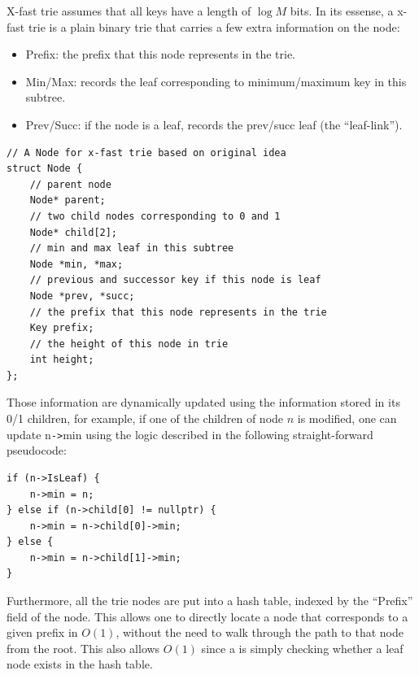 \documentclass[11pt, usletter]{article}
\begin{document}
X-fast trie assumes that all keys have a length of $\log M$ bits.
In its essense, a x-fast trie is a plain binary trie that carries a few extra information on the node:
\begin{itemize}
[topsep=0pt,partopsep=0pt,itemsep=0pt,parsep=0pt,fullwidth,itemindent=\parindent,listparindent=\parindent]
\item Prefix: the prefix that this node represents in the trie.
\item Min/Max: records the leaf corresponding to minimum/maximum key in this subtree.
\item Prev/Succ: if the node is a leaf, records the prev/succ leaf (the ``leaf-link'').
\end{itemize}

\singlespacing\begin{codebox}
\begin{verbatim}
// A Node for x-fast trie based on original idea
struct Node {
    // parent node
    Node* parent;
    // two child nodes corresponding to 0 and 1
    Node* child[2];
    // min and max leaf in this subtree
    Node *min, *max;
    // previous and successor key if this node is leaf
    Node *prev, *succ;
    // the prefix that this node represents in the trie
    Key prefix;
    // the height of this node in trie
    int height;
};
\end{verbatim}
\end{codebox}\doublespacing

Those information are dynamically updated using the information stored in its 0/1 children, 
for example, if one of the children of node $n$ is modified, one can update n\verb|->|min
using the logic described in the following straight-forward pseudocode:

\singlespacing\begin{codebox}
\begin{verbatim}
if (n->IsLeaf) {
    n->min = n;
} else if (n->child[0] != nullptr) {
    n->min = n->child[0]->min;
} else {
    n->min = n->child[1]->min;
}
\end{verbatim}
\end{codebox}\doublespacing

Furthermore, all the trie nodes are put into a hash table, indexed by the ``Prefix'' field of the node. 
This allows one to directly locate a node that corresponds to a given prefix in $O(1)$, without the need to walk through the path 
to that node from the root. This also allows $O(1)$ \lookup 
since a \lookup is simply checking whether a leaf node exists in the hash table.
\end{document}
